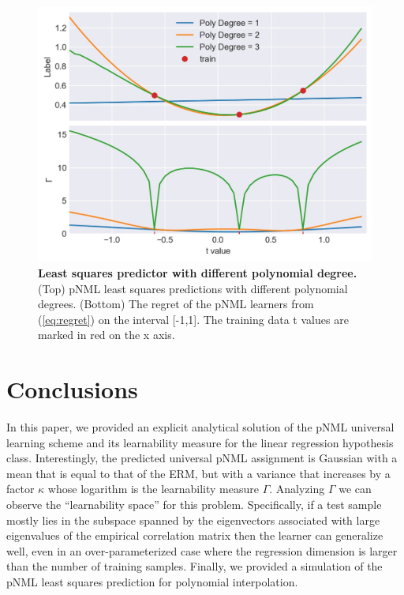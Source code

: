 \documentclass[conference,letterpaper]{IEEEtran}
\begin{document}
\begin{figure}[tb]
    \centering
    \includegraphics[width=\linewidth]{least_squares_with_poly_degree.jpg}
    \caption{\textbf{Least squares predictor with different polynomial degree.} (Top) pNML least squares predictions with different polynomial degrees. (Bottom) The regret of the pNML learners from (\ref{eq:regret}) on the interval [-1,1]. The training data t values are marked in red on the x axis.}
    \label{fig:least_squares_with_poly}
\end{figure}


\section{Conclusions} \label{sec:conclusion}

In this paper, we provided an explicit analytical solution of the pNML universal learning scheme and its learnability measure for the linear regression hypothesis class. 
Interestingly, the predicted universal pNML assignment is Gaussian with a mean that is equal to that of the ERM, but with a variance that increases by a factor $\kappa$ whose logarithm is the learnability measure $\Gamma$.
Analyzing $\Gamma$ we can observe the ``learnability space'' for this problem. 
Specifically, if a test sample mostly lies in the subspace spanned by the eigenvectors associated with large eigenvalues of the empirical correlation matrix then the learner can generalize well, even in an over-parameterized case where the regression dimension is larger than the number of training samples.
Finally, we provided a simulation of the pNML least squares prediction for polynomial interpolation.%
\end{document}
